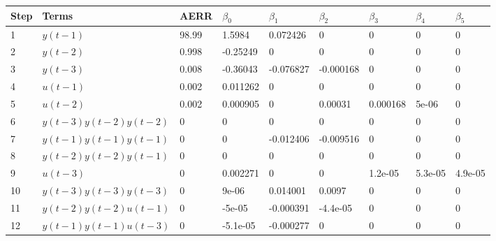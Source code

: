 \begin{tabular}{lllllllll}
Step & Terms & AERR & $\beta_{0}$ & $\beta_{1}$ & $\beta_{2}$ & $\beta_{3}$ & $\beta_{4}$ & $\beta_{5}$ \\ 
\hline 
1 & $y(t-1)$ & 98.99 & 1.5984 & 0.072426 & 0 & 0 & 0 & 0 \\ 
2 & $y(t-2)$ & 0.998 & -0.25249 & 0 & 0 & 0 & 0 & 0 \\ 
3 & $y(t-3)$ & 0.008 & -0.36043 & -0.076827 & -0.000168 & 0 & 0 & 0 \\ 
4 & $u(t-1)$ & 0.002 & 0.011262 & 0 & 0 & 0 & 0 & 0 \\ 
5 & $u(t-2)$ & 0.002 & 0.000905 & 0 & 0.00031 & 0.000168 & 5e-06 & 0 \\ 
6 & $y(t-3)y(t-2)y(t-2)$ & 0 & 0 & 0 & 0 & 0 & 0 & 0 \\ 
7 & $y(t-1)y(t-1)y(t-1)$ & 0 & 0 & -0.012406 & -0.009516 & 0 & 0 & 0 \\ 
8 & $y(t-2)y(t-2)y(t-1)$ & 0 & 0 & 0 & 0 & 0 & 0 & 0 \\ 
9 & $u(t-3)$ & 0 & 0.002271 & 0 & 0 & 1.2e-05 & 5.3e-05 & 4.9e-05 \\ 
10 & $y(t-3)y(t-3)y(t-3)$ & 0 & 9e-06 & 0.014001 & 0.0097 & 0 & 0 & 0 \\ 
11 & $y(t-2)y(t-2)u(t-1)$ & 0 & -5e-05 & -0.000391 & -4.4e-05 & 0 & 0 & 0 \\ 
12 & $y(t-1)y(t-1)u(t-3)$ & 0 & -5.1e-05 & -0.000277 & 0 & 0 & 0 & 0 \\ 
\hline 
\end{tabular}
